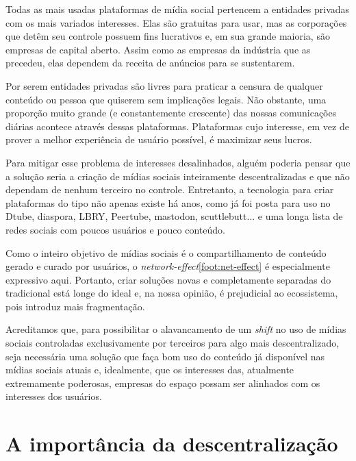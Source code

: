 Todas as mais usadas plataformas de mídia social pertencem a entidades privadas com os mais variados interesses.
Elas são gratuitas para usar, mas as corporações que detêm seu controle possuem fins lucrativos e, em sua grande maioria, são empresas de capital aberto.
Assim como as empresas da indústria que as precedeu, elas dependem da receita de anúncios para se sustentarem.

Por serem entidades privadas são livres para praticar a censura de qualquer conteúdo ou pessoa que quiserem sem implicações legais.
Não obstante, uma proporção muito grande (e constantemente crescente) das nossas comunicações diárias acontece através dessas plataformas.
Plataformas cujo interesse, em vez de prover a melhor experiência de usuário possível, é maximizar seus lucros.

Para mitigar esse problema de interesses desalinhados, alguém poderia pensar que a solução seria a criação de mídias sociais inteiramente descentralizadas e que não dependam de nenhum terceiro no controle.
Entretanto, a tecnologia para criar plataformas do tipo não apenas existe há anos, como já foi posta para uso no Dtube, diaspora, LBRY, Peertube, mastodon, scuttlebutt... e uma longa lista de redes sociais com poucos usuários e pouco conteúdo.

Como o inteiro objetivo de mídias sociais é o compartilhamento de conteúdo gerado e curado por usuários, o \textit{network-effect}\ref{foot:net-effect} é especialmente expressivo aqui.
Portanto, criar soluções novas e completamente separadas do tradicional está longe do ideal e, na nossa opinião, é prejudicial ao ecossistema, pois introduz mais fragmentação.

Acreditamos que, para possibilitar o alavancamento de um \textit{shift} no uso de mídias sociais controladas exclusivamente por terceiros para algo mais descentralizado, seja necessária uma solução que faça bom uso do conteúdo já disponível nas mídias sociais atuais e, idealmente, que os interesses das, atualmente extremamente poderosas, empresas do espaço possam ser alinhados com os interesses dos usuários. 

\section{A importância da descentralização}

